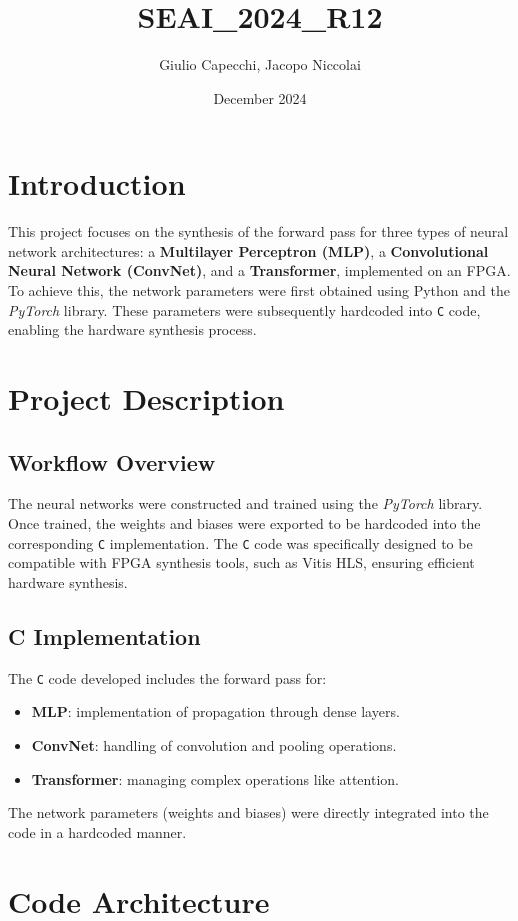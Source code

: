 \documentclass{article}
\title{SEAI\_2024\_R12}
\author{Giulio Capecchi, Jacopo Niccolai}
\date{December 2024}
\begin{document}
\maketitle


\section{Introduction}
This project focuses on the synthesis of the forward pass for three types of neural network architectures: a \textbf{Multilayer Perceptron (MLP)}, a \textbf{Convolutional Neural Network (ConvNet)}, and a \textbf{Transformer}, implemented on an FPGA.  
To achieve this, the network parameters were first obtained using Python and the \textit{PyTorch} library. These parameters were subsequently hardcoded into \texttt{C} code, enabling the hardware synthesis process.

\section{Project Description}
\subsection{Workflow Overview}
The neural networks were constructed and trained using the \textit{PyTorch} library. Once trained, the weights and biases were exported to be hardcoded into the corresponding \texttt{C} implementation. The \texttt{C} code was specifically designed to be compatible with FPGA synthesis tools, such as Vitis HLS, ensuring efficient hardware synthesis.


\subsection{C Implementation}
The \texttt{C} code developed includes the forward pass for:
\begin{itemize}
    \item \textbf{MLP}: implementation of propagation through dense layers.
    \item \textbf{ConvNet}: handling of convolution and pooling operations.
    \item \textbf{Transformer}: managing complex operations like attention.
\end{itemize}

The network parameters (weights and biases) were directly integrated into the code in a hardcoded manner.

\section{Code Architecture}
\end{document}
